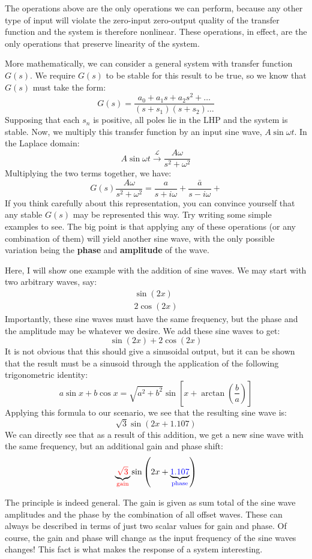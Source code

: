 The operations above are the only operations we can perform, because any other type of input will violate the zero-input zero-output quality of the transfer function and the system is therefore nonlinear. These operations, in effect, are the only operations that preserve linearity of the system.

More mathematically, we can consider a general system with transfer function $G(s)$. We require $G(s)$ to be stable for this result to be true, so we know that $G(s)$ must take the form:
$$G(s) = \frac{a_0+a_1s+a_2s^2+\dots}{(s+s_1)(s+s_2)\dots}$$
Supposing that each $s_n$ is positive, all poles lie in the LHP and the system is stable. Now, we multiply this transfer function by an input sine wave, $A\sin\omega t$. In the Laplace domain:
$$A\sin\omega t \overset{\mathscr{L}}{\rightarrow}\frac{A\omega}{s^2+\omega^2}$$
Multiplying the two terms together, we have:
$$G(s)\frac{A\omega}{s^2+\omega^2}=\frac{a}{s+i\omega}+\frac{\bar{a}}{s-i\omega}+$$
If you think carefully about this representation, you can convince yourself that any stable $G(s)$ may be represented this way. Try writing some simple examples to see. The big point is that applying any of these operations (or any combination of them) will yield another sine wave, with the only possible variation being the \textbf{phase} and \textbf{amplitude} of the wave.

\begin{example}
    Here, I will show one example with the addition of sine waves. We may start with two arbitrary waves, say:\begin{gather}
        \sin(2x)\\
        2\cos(2x)
    \end{gather}
    Importantly, these sine waves must have the same frequency, but the phase and the amplitude may be whatever we desire. We add these sine waves to get:
$$ \sin(2x)+2\cos(2x)$$
It is not obvious that this should give a sinusoidal output, but it can be shown that the result must be a sinusoid through the application of the following trigonometric identity:
$$a\sin x+b\cos x=\sqrt{a^2+b^2}\sin\left[x+\arctan\left(\frac{b}{a}\right)\right]$$
Applying this formula to our scenario, we see that the resulting sine wave is:
$$\sqrt{3}\sin(2x+1.107)$$
We can directly see that as a result of this addition, we get a new sine wave with the same frequency, but an additional gain and phase shift:
\[
\underbrace{\color{red}\sqrt{3}}_{\color{red}\text{gain}}\color{black}\sin\left(2x + \underbrace{\color{blue}1.107}_{\color{blue}\text{phase}}\color{black}\right)
\]
\end{example}
    The principle is indeed general. The gain is given as sum total of the sine wave amplitudes and the phase by the combination of all offset waves. These can always be described in terms of just two scalar values for gain and phase. Of course, the gain and phase will change as the input frequency of the sine waves changes! This fact is what makes the response of a system interesting.

